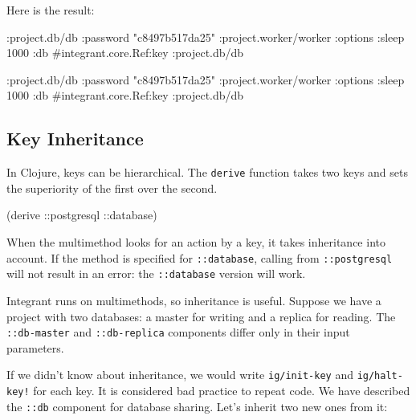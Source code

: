 \fi

\noindent
Here is the result:

\ifnarrow

\begin{english}
  \begin{clojure}
{:project.db/db
 {:password "c8497b517da25"}
 :project.worker/worker
 {:options {:sleep 1000}
  :db
  #integrant.core.Ref{:key
                      :project.db/db}}}
  \end{clojure}
\end{english}

\else

\begin{english}
  \begin{clojure}
{:project.db/db {:password "c8497b517da25"}
 :project.worker/worker
 {:options {:sleep 1000}
  :db #integrant.core.Ref{:key :project.db/db}}}
  \end{clojure}
\end{english}

\fi

\subsection{Key Inheritance}


In Clojure, keys can be hierarchical. The \verb|derive| function takes two keys and sets the superiority of the first over the second.


\begin{english}
  \begin{clojure}
(derive ::postgresql ::database)
  \end{clojure}
\end{english}


When the multimethod looks for an action by a key, it takes inheritance into account. If the method is specified for \verb|::database|, calling from \verb|::postgresql| will not result in an error: the \verb|::database| version will work.

Integrant runs on multimethods, so inheritance is useful. Suppose we have a project with two databases: a master for writing and a replica for reading. The \verb|::db-master| and \verb|::db-replica| components differ only in their input parameters.

If we didn't know about inheritance, we would write \verb|ig/init-key| and \verb|ig/halt-key!| for each key. It is considered bad practice to repeat code. We have described the \verb|::db| component for database sharing. Let's inherit two new ones from it:

